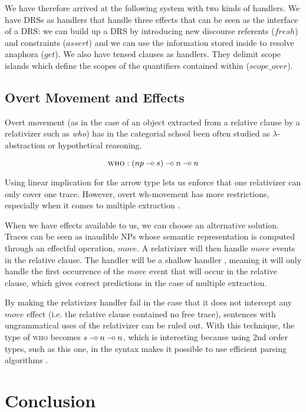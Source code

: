 \documentclass{article}
\def\limp {\mathbin{{-}\mkern-3.5mu{\circ}}}
\begin{document}
We have therefore arrived at the following system with two kinds of
handlers. We have DRSs as handlers that handle three effects that can be seen
as the interface of a DRS: we can build up a DRS by introducing new discourse
referents ($fresh$) and constraints ($assert$) and we can use the information
stored inside to resolve anaphora ($get$). We also have tensed clauses as
handlers. They delimit scope islands which define the scopes of the
quantifiers contained within ($scope\_over$).

\subsection{Overt Movement and Effects}

Overt movement (as in the case of an object extracted from a relative clause
by a relativizer such as \emph{who}) has in the categorial school been often
studied as $\lambda$-abstraction or hypothetical reasoning.

$$
\textsc{who} : (np \limp s) \limp n \limp n
$$

Using linear implication for the arrow type lets us enforce that one
relativizer can only cover one trace. However, overt wh-movement has more
restrictions, especially when it comes to multiple extraction
\citep{pogodalla2012controlling}.

When we have effects available to us, we can choose an alternative
solution. Traces can be seen as inaudible NPs whose semantic representation is
computed through an effectful operation, $move$. A relativizer will then
handle $move$ events in the relative clause. The handler will be a shallow
handler \citep{kammar2013handlers}, meaning it will only handle the first
occurrence of the $move$ event that will occur in the relative clause, which
gives correct predictions in the case of multiple extraction.

By making the relativizer handler fail in the case that it does not intercept
any $move$ effect (i.e. the relative clause contained no free trace),
sentences with ungrammatical uses of the relativizer can be ruled out. With
this technique, the type of \textsc{who} becomes $s \limp n \limp n$, which is
interesting because using 2nd order types, such as this one, in the syntax
makes it possible to use efficient parsing algorithms
\citep{kanazawa2007parsing}.


\section{Conclusion}
\end{document}
